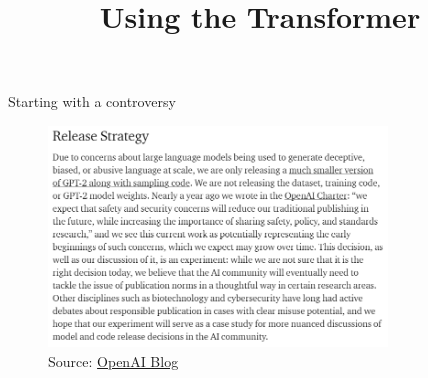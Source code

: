 



\newcommand{\titlefigure}{figure/sesamestreet.jpeg}
\newcommand{\learninggoals}{
\item Get a first idea about prompting
\item Understand the implications of such models}

\title{Using the Transformer}
\date{}




\begin{frame}{Starting with a controversy}

\vfill

\begin{figure}
\centering
\includegraphics[width = 9cm]{figure/gpt2-release.png}\\ 
\footnotesize{Source:} \href{https://openai.com/blog/better-language-models/\#sample1}{\footnotesize OpenAI Blog}
\end{figure}

\vfill

\end{frame}


